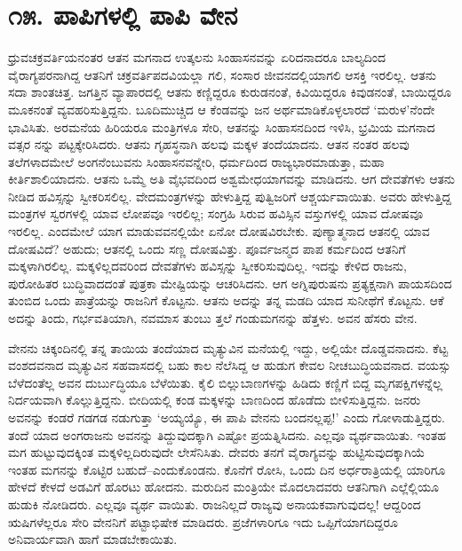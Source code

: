 
\chapter{೧೫. ಪಾಪಿಗಳಲ್ಲಿ ಪಾಪಿ ವೇನ}

ಧ್ರುವಚಕ್ರವರ್ತಿಯನಂತರ ಆತನ ಮಗನಾದ ಉತ್ಕಲನು ಸಿಂಹಾಸನವನ್ನು ಏರಿದನಾದರೂ ಬಾಲ್ಯದಿಂದ ವೈರಾಗ್ಯಪರನಾಗಿದ್ದ ಆತನಿಗೆ ಚಕ್ರವರ್ತಿಪದವಿಯಲ್ಲಾ ಗಲಿ, ಸಂಸಾರ ಜೀವನದಲ್ಲಿಯಾಗಲಿ ಆಸಕ್ತಿ ಇರಲಿಲ್ಲ. ಆತನು ಸದಾ ಶಾಂತಚಿತ್ತ. ಜಗತ್ತಿನ ವ್ಯಾಪಾರದಲ್ಲಿ ಆತನು ಕಣ್ಣಿದ್ದರೂ ಕುರುಡನಂತೆ, ಕಿವಿಯಿದ್ದರೂ ಕಿವುಡನಂತೆ, ಬಾಯಿದ್ದರೂ ಮೂಕನಂತೆ ವ್ಯವಹರಿಸುತ್ತಿದ್ದನು. ಬೂದಿಮುಚ್ಚಿದ ಆ ಕೆಂಡವನ್ನು ಜನ ಅರ್ಥಮಾಡಿಕೊಳ್ಳಲಾರದೆ ‘ಮರುಳ’ನೆಂದೇ ಭಾವಿಸಿತು. ಅರಮನೆಯ ಹಿರಿಯರೂ ಮಂತ್ರಿಗಳೂ ಸೇರಿ, ಆತನನ್ನು ಸಿಂಹಾಸನದಿಂದ ಇಳಿಸಿ, ಭ್ರಮಿಯ ಮಗನಾದ ವತ್ಸರ ನನ್ನು ಪಟ್ಟಕ್ಕೇರಿಸಿದರು. ಆತನು ಗೃಹಸ್ಥನಾಗಿ ಹಲವು ಮಕ್ಕಳ ತಂದೆಯಾದನು. ಆತನ ನಂತರ ಹಲವು ತಲೆಗಳಾದಮೇಲೆ ಅಂಗನೆಂಬುವನು ಸಿಂಹಾಸನವನ್ನೇರಿ, ಧರ್ಮದಿಂದ ರಾಜ್ಯಭಾರಮಾಡುತ್ತಾ, ಮಹಾ ಕೀರ್ತಿಶಾಲಿಯಾದನು. ಆತನು ಒಮ್ಮೆ ಅತಿ ವೈಭವದಿಂದ ಅಶ್ವಮೇಧಯಾಗವನ್ನು ಮಾಡಿದನು. ಆಗ ದೇವತೆಗಳು ಆತನು ನೀಡಿದ ಹವಿಸ್ಸನ್ನು ಸ್ವೀಕರಿಸಲಿಲ್ಲ. ವೇದಮಂತ್ರಗಳನ್ನು ಹೇಳುತ್ತಿದ್ದ ಪುತ್ವಿಜರಿಗೆ ಆಶ್ಚರ್ಯವಾಯಿತು. ಅವರು ಹೇಳುತ್ತಿದ್ದ ಮಂತ್ರಗಳ ಸ್ವರಗಳಲ್ಲಿ ಯಾವ ಲೋಪವೂ ಇರಲಿಲ್ಲ; ಸಂಗ್ರಹಿ ಸಿರುವ ಹವಿಸ್ಸಿನ ವಸ್ತುಗಳಲ್ಲಿ ಯಾವ ದೋಷವೂ ಇರಲಿಲ್ಲ. ಎಂದಮೇಲೆ ಯಾಗ ಮಾಡುವವನಲ್ಲಿಯೇ ಏನೋ ದೋಷವಿರಬೇಕು. ಪುಣ್ಯಾತ್ಮನಾದ ಆತನಲ್ಲಿ ಯಾವ ದೋಷವಿದೆ? ಅಹುದು; ಆತನಲ್ಲಿ ಒಂದು ಸಣ್ಣ ದೋಷವಿತ್ತು. ಪೂರ್ವಜನ್ಮದ ಪಾಪ ಕರ್ಮದಿಂದ ಆತನಿಗೆ ಮಕ್ಕಳಾಗಿರಲಿಲ್ಲ. ಮಕ್ಕಳಿಲ್ಲದವರಿಂದ ದೇವತೆಗಳು ಹವಿಸ್ಸನ್ನು ಸ್ವೀಕರಿಸುವುದಿಲ್ಲ. ಇದನ್ನು ಕೇಳಿದ ರಾಜನು, ಪುರೋಹಿತರ ಬುದ್ಧಿವಾದದಂತೆ ಪುತ್ರಕಾ ಮೇಷ್ಟಿಯನ್ನು ಆಚರಿಸಿದನು. ಆಗ ಅಗ್ನಿಪುರುಷನು ಪ್ರತ್ಯಕ್ಷನಾಗಿ ಪಾಯಸದಿಂದ ತುಂಬಿದ ಒಂದು ಪಾತ್ರೆಯನ್ನು ರಾಜನಿಗೆ ಕೊಟ್ಟನು. ಆತನು ಅದನ್ನು ತನ್ನ ಮಡದಿ ಯಾದ ಸುನೀಥೆಗೆ ಕೊಟ್ಟನು. ಆಕೆ ಅದನ್ನು ತಿಂದು, ಗರ್ಭವತಿಯಾಗಿ, ನವಮಾಸ ತುಂಬು ತ್ತಲೆ ಗಂಡುಮಗನನ್ನು ಹೆತ್ತಳು. ಅವನ ಹೆಸರು ವೇನ.

ವೇನನು ಚಿಕ್ಕಂದಿನಲ್ಲಿ ತನ್ನ ತಾಯಿಯ ತಂದೆಯಾದ ಮೃತ್ಯುವಿನ ಮನೆಯಲ್ಲಿ ಇದ್ದು, ಅಲ್ಲಿಯೇ ದೊಡ್ಡವನಾದನು. ಕೆಟ್ಟ ವಂಶದವನಾದ ಮೃತ್ಯುವಿನ ಸಹವಾಸದಲ್ಲಿ ಬಹು ಕಾಲ ನೆಲೆಸಿದ್ದ ಆ ಹುಡುಗ ಕೇವಲ ನೀಚಬುದ್ಧಿಯವನಾದ. ವಯಸ್ಸು ಬೆಳೆದಂತೆಲ್ಲ ಅವನ ದುರ್ಬುದ್ಧಿಯೂ ಬೆಳೆಯಿತು. ಕೈಲಿ ಬಿಲ್ಲುಬಾಣಗಳನ್ನು ಹಿಡಿದು ಕಣ್ಣಿಗೆ ಬಿದ್ದ ಮೃಗಪಕ್ಷಿಗಳನ್ನೆಲ್ಲ ನಿರ್ದಯವಾಗಿ ಕೊಲ್ಲುತ್ತಿದ್ದನು. ಬೀದಿಯಲ್ಲಿ ಕಂಡ ಮಕ್ಕಳನ್ನು ಬಾಣದಿಂದ ಹೊಡೆದು ಬೀಳಿಸುತ್ತಿದ್ದನು. ಜನರು ಅವನನ್ನು ಕಂಡರೆ ಗಡಗಡ ನಡುಗುತ್ತಾ ‘ಅಯ್ಯಯ್ಯೊ, ಈ ಪಾಪಿ ವೇನನು ಬಂದನಲ್ಲಪ್ಪ!’ ಎಂದು ಗೋಳಾಡುತ್ತಿದ್ದರು. ತಂದೆ ಯಾದ ಅಂಗರಾಜನು ಅವನನ್ನು ತಿದ್ದುವುದಕ್ಕಾಗಿ ಎಷ್ಟೋ ಪ್ರಯತ್ನಿಸಿದನು. ಎಲ್ಲವೂ ವ್ಯರ್ಥವಾಯಿತು. ಇಂತಹ ಮಗ ಹುಟ್ಟುವುದಕ್ಕಿಂತ ಮಕ್ಕಳಿಲ್ಲದಿರುವುದೇ ಲೇಸೆನಿಸಿತು. ದೇವರು ತನಗೆ ವೈರಾಗ್ಯವನ್ನು ಹುಟ್ಟಿಸುವುದಕ್ಕಾಗಿಯೆ ಇಂತಹ ಮಗನನ್ನು ಕೊಟ್ಟಿರ ಬಹುದೆ–ಎಂದುಕೊಂಡನು. ಕೊನೆಗೆ ರೋಸಿ, ಒಂದು ದಿನ ಅರ್ಧರಾತ್ರಿಯಲ್ಲಿ ಯಾರಿಗೂ ಹೇಳದೆ ಕೇಳದೆ ಅಡವಿಗೆ ಹೊರಟು ಹೋದನು. ಮರುದಿನ ಮಂತ್ರಿಯೇ ಮೊದಲಾದವರು ಆತನಿಗಾಗಿ ಎಲ್ಲೆಲ್ಲಿಯೂ ಹುಡುಕಿ ನೋಡಿದರು. ಎಲ್ಲವೂ ವ್ಯರ್ಥ ವಾಯಿತು. ರಾಜನಿಲ್ಲದೆ ರಾಜ್ಯವು ಅನಾಯಕವಾಗುವುದಲ್ಲ! ಆದ್ದರಿಂದ ಋಷಿಗಳೆಲ್ಲರೂ ಸೇರಿ ವೇನನಿಗೆ ಪಟ್ಟಾಭಿಷೇಕ ಮಾಡಿದರು. ಪ್ರಜೆಗಳಾರಿಗೂ ಇದು ಒಪ್ಪಿಗೆಯಾಗದಿದ್ದರೂ ಅನಿವಾರ್ಯವಾಗಿ ಹಾಗೆ ಮಾಡಬೇಕಾಯಿತು. 

